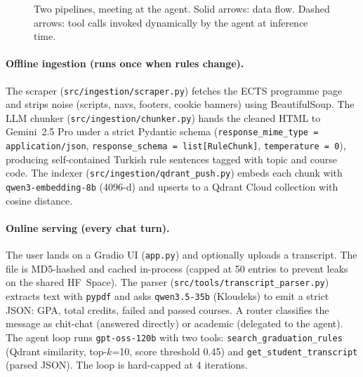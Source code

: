 \documentclass[11pt,a4paper]{article}
\begin{document}
\begin{figure}[h!]
\caption{Two pipelines, meeting at the agent. Solid arrows: data flow.
Dashed arrows: tool calls invoked dynamically by the agent at inference time.}
\label{fig:arch}
\end{figure}

\paragraph{Offline ingestion (runs once when rules change).} The scraper
(\texttt{src/ingestion/scraper.py}) fetches the ECTS programme page and strips
noise (scripts, navs, footers, cookie banners) using BeautifulSoup. The LLM
chunker (\texttt{src/ingestion/chunker.py}) hands the cleaned HTML to Gemini~2.5
Pro under a strict Pydantic schema (\texttt{response\_mime\_type = application/json},
\texttt{response\_schema = list[RuleChunk]}, \texttt{temperature = 0}), producing
self-contained Turkish rule sentences tagged with topic and course code. The
indexer (\texttt{src/ingestion/qdrant\_push.py}) embeds each chunk with
\texttt{qwen3-embedding-8b} (4096-d) and upserts to a Qdrant Cloud collection
with cosine distance.

\paragraph{Online serving (every chat turn).} The user lands on a Gradio UI
(\texttt{app.py}) and optionally uploads a transcript. The file is MD5-hashed
and cached in-process (capped at 50 entries to prevent leaks on the shared
HF~Space). The parser (\texttt{src/tools/transcript\_parser.py}) extracts text
with \texttt{pypdf} and asks \texttt{qwen3.5-35b} (Kloudeks) to emit a strict
JSON: GPA, total credits, failed and passed courses. A router classifies the
message as chit-chat (answered directly) or academic (delegated to the agent).
The agent loop runs \texttt{gpt-oss-120b} with two tools:
\texttt{search\_graduation\_rules} (Qdrant similarity, top-$k$=10, score
threshold 0.45) and \texttt{get\_student\_transcript} (parsed JSON). The loop is
hard-capped at 4 iterations.
\end{document}
